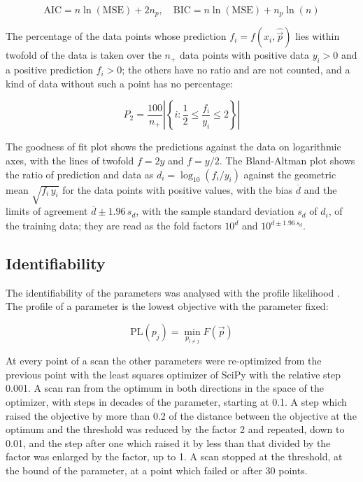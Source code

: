 \documentclass{article}
\begin{document}
\begin{equation}
\mathrm{AIC} = n \ln(\mathrm{MSE}) + 2 n_p, \quad \mathrm{BIC} = n \ln(\mathrm{MSE}) + n_p \ln(n)
\end{equation}

The percentage of the data points whose prediction $f_i = f(x_i, \hat{\vec{p}})$ lies within twofold of the data is taken over the $n_+$ data points with positive data $y_i > 0$ and a positive prediction $f_i > 0$; the others have no ratio and are not counted, and a kind of data without such a point has no percentage:

\begin{equation}
P_2 = \frac{100}{n_+} \left|\left\{ i : \frac{1}{2} \le \frac{f_i}{y_i} \le 2 \right\}\right|
\end{equation}

The goodness of fit plot shows the predictions against the data on logarithmic axes, with the lines of twofold $f = 2y$ and $f = y/2$. The Bland-Altman plot \cite{Bland1986} shows the ratio of prediction and data as $d_i = \log_{10}(f_i / y_i)$ against the geometric mean $\sqrt{f_i\, y_i}$ for the data points with positive values, with the bias $\overline{d}$ and the limits of agreement $\overline{d} \pm 1.96\, s_d$, with the sample standard deviation $s_d$ of $d_i$, of the training data; they are read as the fold factors $10^{\overline{d}}$ and $10^{\overline{d} \pm 1.96\, s_d}$.

\subsection{Identifiability}

The identifiability of the parameters was analysed with the profile likelihood \cite{Raue2009,Kreutz2013}. The profile of a parameter is the lowest objective with the parameter fixed:

\begin{equation}
\mathrm{PL}(p_j) = \min_{p_{l \neq j}} F(\vec{p})
\end{equation}

At every point of a scan the other parameters were re-optimized from the previous point with the least squares optimizer of SciPy with the relative step 0.001. A scan ran from the optimum in both directions in the space of the optimizer, with steps in decades of the parameter, starting at 0.1. A step which raised the objective by more than 0.2 of the distance between the objective at the optimum and the threshold was reduced by the factor 2 and repeated, down to 0.01, and the step after one which raised it by less than that divided by the factor was enlarged by the factor, up to 1. A scan stopped at the threshold, at the bound of the parameter, at a point which failed or after 30 points.
\end{document}
